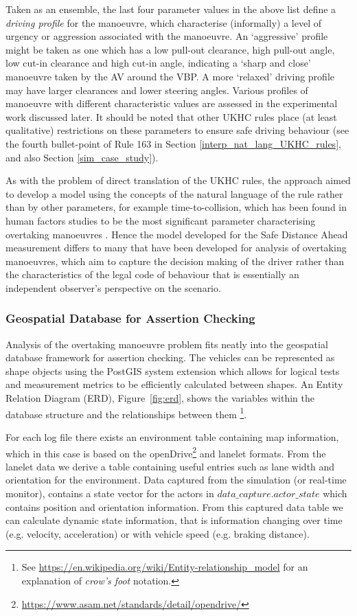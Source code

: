 Taken as an ensemble, the last four parameter values in the above list define a \emph{driving profile} for the manoeuvre, which characterise  (informally) a level of urgency or aggression associated with the manoeuvre. An `aggressive' profile might be taken as one which has a low pull-out clearance, high pull-out angle, low cut-in clearance and high cut-in angle, indicating a `sharp and close' manoeuvre taken by the AV around the VBP. A more `relaxed' driving profile may have larger clearances and lower steering angles. Various profiles of manoeuvre with different characteristic values are assessed in the experimental work discussed later. It should be noted that other UKHC rules place (at least qualitative) restrictions on these parameters to ensure safe driving behaviour (see the fourth bullet-point of Rule 163 in Section \ref{interp_nat_lang_UKHC_rules}, and also Section \ref{sim_case_study}). 

As with the problem of direct translation of the UKHC rules, the approach aimed to develop a model using the concepts of the natural language of the rule rather than by other parameters, for example time-to-collision, which has been found in human factors studies to be the most significant parameter characterising overtaking manoeuvres \cite{lenard2018, Chen2015}. Hence the model developed for the Safe Distance Ahead measurement differs to many that have been developed for analysis of overtaking manoeuvres, which aim to capture the decision making of the driver rather than the characteristics of the legal code of behaviour that is essentially an independent observer's perspective on the scenario.

\subsubsection{Geospatial Database for Assertion Checking}
Analysis of the overtaking manoeuvre problem fits neatly into the geospatial database framework for assertion checking. The vehicles can be represented as shape objects using the PostGIS system extension which allows for logical tests and measurement metrics to be efficiently calculated between shapes. An Entity Relation Diagram (ERD), Figure~\ref{fig:erd}, shows the variables within the database structure and the relationships between them \footnote{See \url{https://en.wikipedia.org/wiki/Entity-relationship\_model} for an explanation of \textit{crow's foot} notation.}. 

For each log file there exists an environment table containing map information, which in this case is based on the openDrive\footnote{\url{https://www.asam.net/standards/detail/opendrive/}} and lanelet formats. From the lanelet data we derive a table containing useful entries such as lane width and orientation for the environment. Data captured from the simulation (or real-time monitor), contains a state vector for the actors in $data\_capture.actor\_state$ which contains position and orientation information. From this captured data table we can calculate dynamic state information, that is information changing over time (e.g. velocity, acceleration) or with vehicle speed (e.g. braking distance). 


